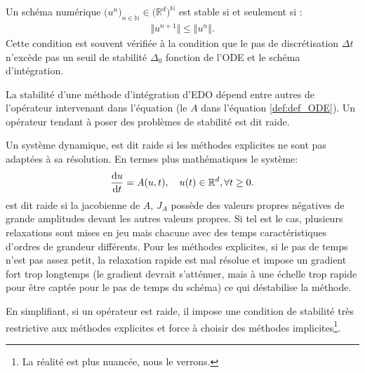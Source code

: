 \begin{definition}
    Un schéma numérique $\bigl( u^n \bigr)_{n \in \mathbb{N}} \in\bigl(\mathbb{R}^d \bigr)^{\mathbb{N}}$ est stable si et seulement si :
    \begin{align}
        \Vert u^{n+1} \Vert \leq \Vert u^n \Vert.
    \end{align}
    Cette condition est souvent vérifiée à la condition que le pas de discrétisation $\Delta t$ n'excède pas un seuil de stabilité $\Delta_0$ fonction de l'ODE et le schéma d'intégration.
\end{definition}
La stabilité d'une méthode d'intégration d'EDO dépend entre autres de l'opérateur intervenant dans l'équation (le $A$ dans l'équation \ref{def:def_ODE}).
Un opérateur tendant à poser des problèmes de stabilité est dit raide.
\begin{definition}
    Un système dynamique, est dit raide si les méthodes explicites ne sont pas adaptées à sa résolution.
    En termes plus mathématiques le système:
    \begin{align}
    \frac{\text d u}{\text{d}t} = A(u,t), \quad u(t) \in \mathbb{R}^d, \forall t\geq 0.
    \end{align}
    est dit raide si la jacobienne de $A$, $J_A$ possède des valeurs propres négatives de grande amplitudes devant les autres valeurs propres.
    Si tel est le cas, plusieurs relaxations sont mises en jeu mais chacune avec des temps caractéristiques d'ordres de grandeur différents.
    Pour les méthodes explicites, si le pas de temps n'est pas assez petit, la relaxation rapide est mal résolue et
    impose un gradient fort trop longtemps (le gradient devrait s'atténuer, mais à une échelle trop rapide pour être captée pour le pas de temps du schéma) ce qui 
    déstabilise la méthode.
\end{definition}
En simplifiant, si un opérateur est raide, il impose une condition de stabilité très restrictive aux méthodes explicites et 
force à choisir des méthodes implicites\footnote{La réalité est plus nuancée, nous le verrons.}.
